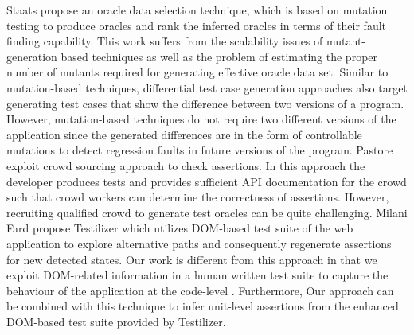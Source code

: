 Staats \etal \cite{staats:icse12} propose an oracle data selection technique, which is based on mutation testing to produce oracles and rank the inferred oracles in terms of their fault finding capability. This work suffers from the scalability issues of mutant-generation based techniques as well as the problem of estimating the proper number of mutants required for generating effective oracle data set.
Similar to mutation-based techniques, differential test case generation approaches \cite{taneja:ase08, elbaum:tse09} also target generating test cases that show the difference between two versions of a program. However, mutation-based techniques do not require two different versions of the application since the generated differences are in the form of controllable mutations to detect regression faults in future versions of the program.
Pastore \etal \cite{pastore:icst13} exploit crowd sourcing approach to check assertions. In this approach the developer produces tests and provides sufficient API documentation for the crowd such that crowd workers can determine the correctness of assertions. However, recruiting qualified crowd to generate test oracles can be quite challenging.
Milani Fard \etal \cite{milanifard:ase14} propose Testilizer which utilizes DOM-based test suite of the web application to explore alternative paths and consequently regenerate assertions for new detected states. Our work is different from this approach in that we exploit DOM-related information in a human written test suite to capture the behaviour of the application at the code-level \javascript. Furthermore, Our approach can be combined with this technique to infer unit-level \javascript assertions from the enhanced DOM-based test suite provided by Testilizer.  
  



